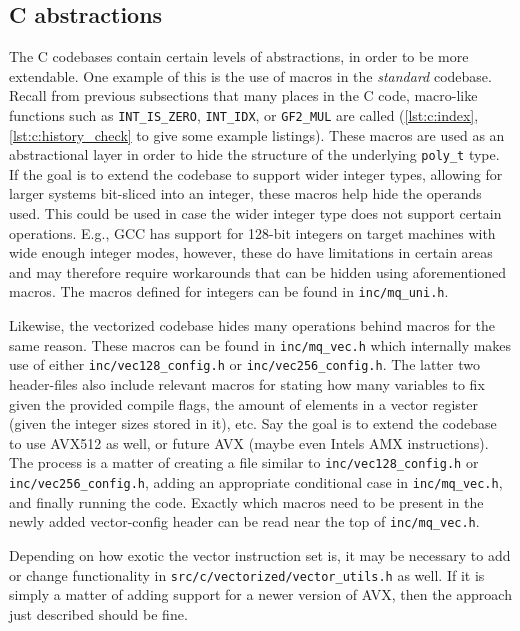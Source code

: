 \subsection{C abstractions} \label{sec:impl:c_abstr}
The C codebases contain certain levels of abstractions, in order to be more extendable. One example of this is the use of macros in the \textit{standard} codebase. Recall from previous subsections that many places in the C code, macro-like functions such as \texttt{INT\_IS\_ZERO}, \texttt{INT\_IDX}, or \texttt{GF2\_MUL} are called (\cref{lst:c:index}, \cref{lst:c:history_check} to give some example listings). These macros are used as an abstractional layer in order to hide the structure of the underlying \texttt{poly\_t} type. If the goal is to extend the codebase to support wider integer types, allowing for larger systems bit-sliced into an integer, these macros help hide the operands used. This could be used in case the wider integer type does not support certain operations. E.g., GCC has support for 128-bit integers on target machines with wide enough integer modes, however, these do have limitations in certain areas and may therefore require workarounds that can be hidden using aforementioned macros. The macros defined for integers can be found in \texttt{inc/mq\_uni.h}.

Likewise, the vectorized codebase hides many operations behind macros for the same reason. These macros can be found in \texttt{inc/mq\_vec.h} which internally makes use of either \texttt{inc/vec128\_config.h} or \texttt{inc/vec256\_config.h}. The latter two header-files also include relevant macros for stating how many variables to fix given the provided compile flags, the amount of elements in a vector register (given the integer sizes stored in it), etc. Say the goal is to extend the codebase to use AVX512 as well, or future AVX (maybe even Intels AMX instructions). The process is a matter of creating a file similar to \texttt{inc/vec128\_config.h} or \texttt{inc/vec256\_config.h}, adding an appropriate conditional case in \texttt{inc/mq\_vec.h}, and finally running the code. Exactly which macros need to be present in the newly added vector-config header can be read near the top of \texttt{inc/mq\_vec.h}. 

Depending on how exotic the vector instruction set is, it may be necessary to add or change functionality in \texttt{src/c/vectorized/vector\_utils.h} as well. If it is simply a matter of adding support for a newer version of AVX, then the approach just described should be fine.

